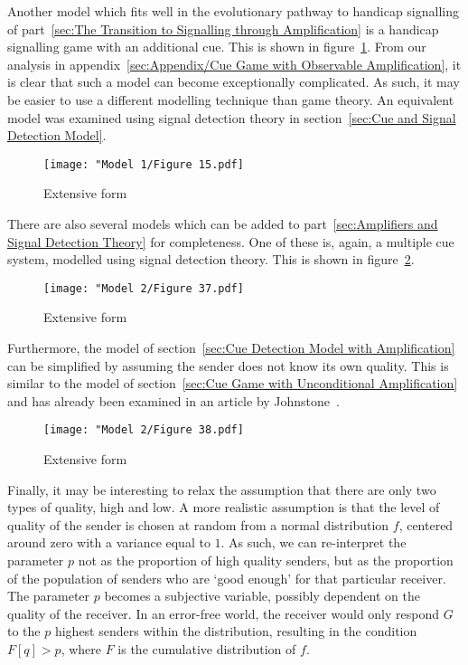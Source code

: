 \documentclass[a4paper,12pt]{article}
\numberwithin{equation}{section}
\begin{document}
\newpage

Another model which fits well in the evolutionary pathway to handicap signalling of part~\ref{sec:The Transition to Signalling through Amplification} is a handicap signalling game with an additional cue. This is shown in figure~\ref{fig:Model 1/Figure 15.pdf}. From our analysis in appendix~\ref{sec:Appendix/Cue Game with Observable Amplification}, it is clear that such a model can become exceptionally complicated. As such, it may be easier to use a different modelling technique than game theory. An equivalent model was examined using signal detection theory in section~\ref{sec:Cue and Signal Detection Model}.

\begin{figure}[h]
\begin{center}
\leavevmode
\texttt{[image: "Model 1/Figure 15.pdf]}
\caption{Extensive form}
\label{fig:Model 1/Figure 15.pdf}
\end{center}
\end{figure}

\newpage

There are also several models which can be added to part~\ref{sec:Amplifiers and Signal Detection Theory} for completeness. One of these is, again, a multiple cue system, modelled using signal detection theory. This is shown in figure~\ref{fig:Model 2/Figure 37.pdf}.
\begin{figure}[!h]
\begin{center}
\leavevmode
\texttt{[image: "Model 2/Figure 37.pdf]}
\caption{Extensive form}
\label{fig:Model 2/Figure 37.pdf}
\end{center}
\end{figure}

Furthermore, the model of section~\ref{sec:Cue Detection Model with Amplification} can be simplified by assuming the sender does not know its own quality. This is similar to the model of section~\ref{sec:Cue Game with Unconditional Amplification} and has already been examined in an article by Johnstone~\cite{Johnstone1997}.
\begin{figure}[!h]
\begin{center}
\leavevmode
\texttt{[image: "Model 2/Figure 38.pdf]}
\caption{Extensive form}
\label{fig:Model 2/Figure 38.pdf}
\end{center}
\end{figure}

\newpage

Finally, it may be interesting to relax the assumption that there are only two types of quality, high and low. A more realistic assumption is that the level of quality of the sender is chosen at random from a normal distribution $f$, centered around zero with a variance equal to $1$. As such, we can re-interpret the parameter $p$ not as the proportion of high quality senders, but as the proportion of the population of senders who are `good enough' for that particular receiver. The parameter $p$ becomes a subjective variable, possibly dependent on the quality of the receiver. In an error-free world, the receiver would only respond $G$ to the $p$ highest senders within the distribution, resulting in the condition $F[q]>p$, where $F$ is the cumulative distribution of $f$.
\end{document}
